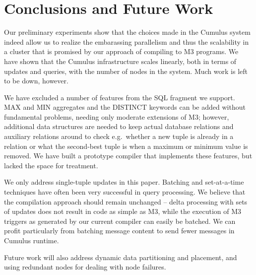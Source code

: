 

\section{Conclusions and Future Work}
\label{sec:conclusions}


Our preliminary experiments show that the choices made in the Cumulus
system indeed allow us to realize the embarassing parallelism and
thus the scalability in a cluster that is promised by our approach of
compiling to M3 programs.  We have shown that the Cumulus infrastructure scales linearly, both in terms of updates and queries, with the number of nodes in the system.  Much work is left to be down, however.


We have excluded a number of features from the SQL fragment we support.
MAX and MIN aggregates and the DISTINCT keywords can be added without
fundamental problems, needing only moderate extensions of M3; however,
additional data structures are needed to keep actual database relations
and auxiliary relations
around to check e.g.\ whether a new tuple is already in a relation or what the
second-best tuple is when a maximum or minimum value is removed. We
have built a prototype compiler that implements these features, but lacked the
space for treatment.



We only address single-tuple updates in this paper.
Batching and set-at-a-time techniques have often been
very successful in query processing.
We believe that the compilation approach
should remain unchanged -- delta processing with sets of updates does not
result in code as simple as M3, while the
execution of M3 triggers as generated by our current compiler
can easily be batched. We can profit
particularly from batching message content to send fewer messages in
Cumulus runtime. 



Future work will also address dynamic data partitioning and placement,
and using redundant nodes for
dealing with node failures.


